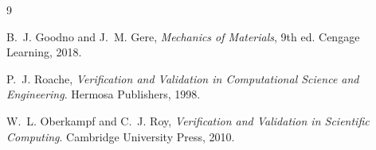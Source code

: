 \documentclass[12pt, letterpaper]{article}
\begin{document}
\begin{thebibliography}{9}

B.~J. Goodno and J.~M. Gere,
\textit{Mechanics of Materials}, 9th ed.
Cengage Learning, 2018.

P.~J. Roache,
\textit{Verification and Validation in Computational Science and Engineering}.
Hermosa Publishers, 1998.

W.~L. Oberkampf and C.~J. Roy,
\textit{Verification and Validation in Scientific Computing}.
Cambridge University Press, 2010.

\end{thebibliography}

\end{document}
